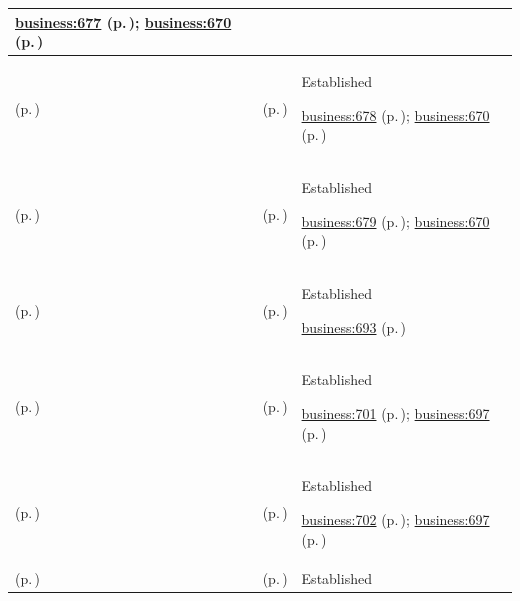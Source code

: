 \begin{longtable}{|>{\raggedright\arraybackslash}p{0.27\TableWidth}|>{\raggedright\arraybackslash}p{0.27\TableWidth}|>{\raggedright\arraybackslash}p{0.46\TableWidth}|}
 \hyperref[rad:business:672]{business:677} (p.\,\pageref{rad:business:672}); \hyperref[rad:business:670]{business:670} (p.\,\pageref{rad:business:670})\\\hline
\nameref{cap:bc-clinical-knowledge-management} (p.\,\pageref{cap:bc-clinical-knowledge-management}) & \nameref{cap:bc-clinical-knowledge-review-approval-management} (p.\,\pageref{cap:bc-clinical-knowledge-review-approval-management}) & Established

 \hyperref[rad:business:672]{business:678} (p.\,\pageref{rad:business:672}); \hyperref[rad:business:670]{business:670} (p.\,\pageref{rad:business:670})\\\hline
\nameref{cap:bc-clinical-knowledge-management} (p.\,\pageref{cap:bc-clinical-knowledge-management}) & \nameref{cap:bc-clinical-knowledge-publication-sharing} (p.\,\pageref{cap:bc-clinical-knowledge-publication-sharing}) & Established

 \hyperref[rad:business:672]{business:679} (p.\,\pageref{rad:business:672}); \hyperref[rad:business:670]{business:670} (p.\,\pageref{rad:business:670})\\\hline
\nameref{cap:bc-standards-semantics-reference-governance} (p.\,\pageref{cap:bc-standards-semantics-reference-governance}) & \nameref{cap:bc-health-information-standards-governance} (p.\,\pageref{cap:bc-health-information-standards-governance}) & Established

 \hyperref[rad:business:693]{business:693} (p.\,\pageref{rad:business:693})\\\hline
\nameref{cap:bc-health-information-standards-governance} (p.\,\pageref{cap:bc-health-information-standards-governance}) & \nameref{cap:bc-information-model-discovery} (p.\,\pageref{cap:bc-information-model-discovery}) & Established

 \hyperref[rad:business:699]{business:701} (p.\,\pageref{rad:business:699}); \hyperref[rad:business:697]{business:697} (p.\,\pageref{rad:business:697})\\\hline
\nameref{cap:bc-health-information-standards-governance} (p.\,\pageref{cap:bc-health-information-standards-governance}) & \nameref{cap:bc-information-model-adoption} (p.\,\pageref{cap:bc-information-model-adoption}) & Established

 \hyperref[rad:business:699]{business:702} (p.\,\pageref{rad:business:699}); \hyperref[rad:business:697]{business:697} (p.\,\pageref{rad:business:697})\\\hline
\nameref{cap:bc-health-information-standards-governance} (p.\,\pageref{cap:bc-health-information-standards-governance}) & \nameref{cap:bc-information-model-education} (p.\,\pageref{cap:bc-information-model-education}) & Established


\end{longtable}
